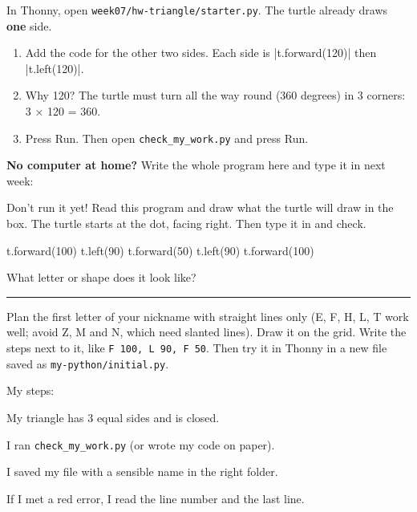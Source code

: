 \namedateline

\begin{core}
In Thonny, open \texttt{week07/hw-triangle/starter.py}. The turtle already draws \textbf{one} side.
\begin{enumerate}[leftmargin=1.4em,itemsep=1pt]
  \item Add the code for the other two sides. Each side is \py|t.forward(120)| then \py|t.left(120)|.
  \item Why 120? The turtle must turn all the way round (360 degrees) in 3 corners: 3 × 120 = 360.
  \item Press Run. Then open \texttt{check\_my\_work.py} and press Run.
\end{enumerate}
\textbf{No computer at home?} Write the whole program here and type it in next week:
\end{core}

\begin{challenge}
Don't run it yet! Read this program and draw what the turtle will draw in the box. The turtle starts at the dot, facing right. Then type it in and check.
\begin{pycode}
t.forward(100)
t.left(90)
t.forward(50)
t.left(90)
t.forward(100)
\end{pycode}
What letter or shape does it look like? \rule{5cm}{0.4pt}
\end{challenge}

\begin{creative}[My initial]
Plan the first letter of your nickname with straight lines only (E, F, H, L, T work well; avoid Z, M and N, which need slanted lines). Draw it on the grid. Write the steps next to it, like \texttt{F 100, L 90, F 50}. Then try it in Thonny in a new file saved as \texttt{my-python/initial.py}.
\par\medskip
\hfill
\begin{minipage}[b]{0.38\linewidth}
My steps:
\end{minipage}
\end{creative}

\begin{selfcheck}
  \item My triangle has 3 equal sides and is closed.
  \item I ran \texttt{check\_my\_work.py} (or wrote my code on paper).
  \item I saved my file with a sensible name in the right folder.
  \item If I met a red error, I read the line number and the last line.
\end{selfcheck}
